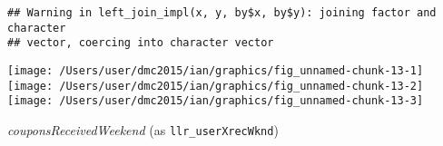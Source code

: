 \documentclass[10pt]{report}
\newenvironment{Shaded}{}{}
\newcommand{\KeywordTok}[1]{\textcolor[rgb]{0.00,0.44,0.13}{\textbf{{#1}}}}
\newcommand{\DataTypeTok}[1]{\textcolor[rgb]{0.56,0.13,0.00}{{#1}}}
\newcommand{\StringTok}[1]{\textcolor[rgb]{0.25,0.44,0.63}{{#1}}}
\newcommand{\NormalTok}[1]{{#1}}
\begin{document}
\begin{Shaded}
\end{Shaded}

\begin{verbatim}
## Warning in left_join_impl(x, y, by$x, by$y): joining factor and character
## vector, coercing into character vector
\end{verbatim}

\begin{Shaded}
\end{Shaded}

\begin{center}\texttt{[image: /Users/user/dmc2015/ian/graphics/fig\_unnamed-chunk-13-1]} \texttt{[image: /Users/user/dmc2015/ian/graphics/fig\_unnamed-chunk-13-2]} \texttt{[image: /Users/user/dmc2015/ian/graphics/fig\_unnamed-chunk-13-3]} \end{center}

\emph{couponsReceivedWeekend} (as \texttt{llr\_userXrecWknd})
\end{document}
